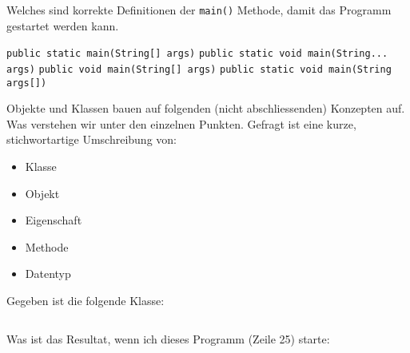 \documentclass[12pt,a4paper]{exam}
\begin{document}
\begin{questions}
        {%
        \checkboxchar{$\Box$} %
        \question[4] Welches sind korrekte Definitionen der \texttt{main()} Methode,
        damit das Programm gestartet werden kann.
        \addpoints
        \begin{checkboxes}
            \choice \texttt{public static main(String[] args)}
            \CorrectChoice \texttt{public static void main(String... args)}
            \choice \texttt{public void main(String[] args)}
            \CorrectChoice \texttt{public static void main(String args[])}
        \end{checkboxes}
        }%

        \newpage
        \question[10]
        Objekte und Klassen bauen auf folgenden (nicht abschliessenden) Konzepten auf.
        Was verstehen wir unter den einzelnen Punkten. Gefragt ist eine kurze, stichwortartige
        Umschreibung von:
        \begin{itemize}
            \item Klasse
            \item Objekt
            \item Eigenschaft
            \item Methode
            \item Datentyp
        \end{itemize}
        \makeemptybox{\fill}

        \newpage
        \question[10]
        Gegeben ist die folgende Klasse:
        \inputminted[autogobble,linenos]{java}{../java/academy/calculator/InputValidator.java}

        Was ist das Resultat, wenn ich dieses Programm (Zeile 25) starte:
        \makeemptybox{\fill}

    \end{questions}
\end{document}
